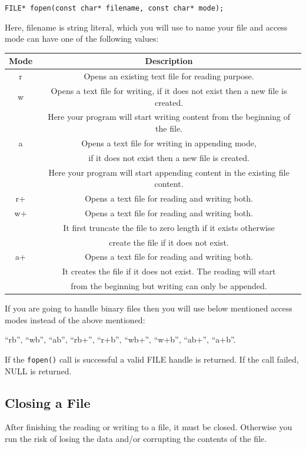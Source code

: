 \documentclass[11pt,a4paper]{article}
\begin{document}
 \lstinline!FILE* fopen(const char* filename, const char* mode);!

Here, filename is string literal, which you will use to name your file and access mode can have one of the following values:

\begin{table}[ht]
\begin{center}
\begin{tabular}{|c|c|}\hline
\textbf{Mode} & \textbf{Description}\\ \hline
r  & Opens an existing text file for reading purpose.\\ \hline
w  & Opens a text file for writing, if it does not exist then a new file is created.\\
   & Here your program will start writing content from the beginning of the file.\\ \hline
a  & Opens a text file for writing in appending mode, \\
   & if it does not exist then a new file is created. \\
   & Here your program will start appending content in the existing file content.\\ \hline
r+ & Opens a text file for reading and writing both.\\ \hline
w+ & Opens a text file for reading and writing both. \\
   & It first truncate the file to zero length if it exists otherwise\\
   & create the file if it does not exist.\\ \hline
a+ & Opens a text file for reading and writing both.\\
   & It creates the file if it does not exist. The reading will start \\
   & from the beginning but writing can only be appended.\\ \hline
\end{tabular}
\end{center}
\end{table}
If you are going to handle binary files then you will use below mentioned access modes instead of the above mentioned: 

``rb'', ``wb'', ``ab'', ``rb+'', ``r+b'', ``wb+'', ``w+b'', ``ab+'', ``a+b''.

If the \texttt{fopen()} call is successful a valid FILE handle is returned. If the call failed, NULL is returned.

\subsection*{Closing a File}
After finishing the reading or writing to a file, it must be closed. Otherwise you run the risk of losing the data and/or corrupting the contents of the file.
\end{document}
